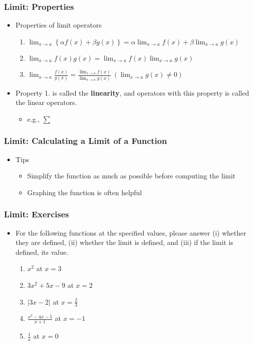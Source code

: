 \documentclass[pdflatex, 12pt]{beamer}
\begin{document}
\begin{frame}
\frametitle{Limit: Properties}
\begin{itemize}
\item Properties of limit operators
 \begin{enumerate}
 \item $\lim_{x \to a} \left\{\alpha f(x) + \beta g(x)\right\} = \alpha \lim_{x \to a} f(x) + \beta \lim_{x \to a} g(x)$
 \item $\lim_{x \to a} f(x)g(x) = \lim_{x \to a} f(x) \lim_{x \to a} g(x)$
 \item $\lim_{x \to a} \frac{f(x)}{g(x)} = \frac{\lim_{x \to a} f(x)}{\lim_{x \to a} g(x)} \ (\lim_{x \to a} g(x) \neq 0)$
 \end{enumerate}
\vspace{0.4cm}
\item Property 1. is called the \textbf{linearity}, and operators with this property is called the linear operators.
 \begin{itemize}
 \item e.g., $\sum$
 \end{itemize}
\end{itemize}
\end{frame}

\begin{frame}
\frametitle{Limit: Calculating a Limit of a Function}
\begin{itemize}
\item Tips
 \begin{itemize}
 \item Simplify the function as much as possible before computing the limit
 \item Graphing the function is often helpful
 \end{itemize}
\end{itemize}
\end{frame}

\begin{frame}
\frametitle{Limit: Exercises}
\begin{itemize}
\item For the following functions at the specified values, please answer (i) whether they are defined, (ii) whether the limit is defined, and (iii) if the limit is defined, its value.
 \begin{enumerate}
 \item $x^2$ at $x = 3$
 \item $3x^2 + 5x - 9$ at $x = 2$
 \item $|3x - 2|$ at $x = \frac{2}{3}$
 \vspace{0.1cm}
 \item $\frac{x^2 - 4x - 5}{x + 1}$ at $x = -1$
 \vspace{0.1cm}
 \item $\frac{1}{x}$ at $x = 0$
 \end{enumerate}
\end{itemize}
\end{frame}
\end{document}
